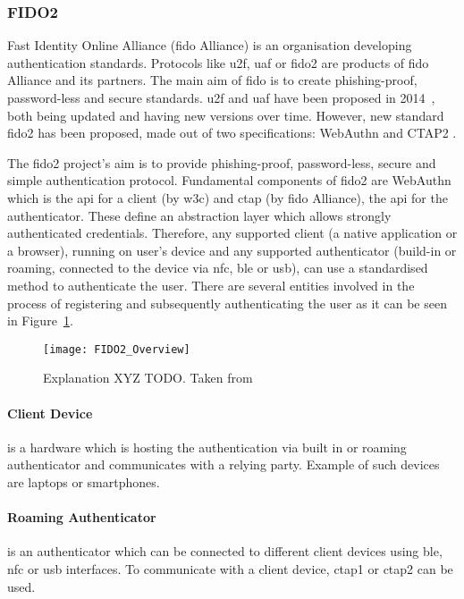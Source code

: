 \subsubsection{FIDO2}

Fast Identity Online Alliance (\acrshort{fido} Alliance) is an organisation developing authentication standards. Protocols like \acrfull{u2f}, \acrfull{uaf} or \acrshort{fido}2 are products of \acrshort{fido} Alliance and its partners.
The main aim of \acrshort{fido} is to create phishing-proof, password-less and secure standards. \acrshort{u2f} and \acrshort{uaf} have been proposed in 2014~\cite{Lindemann2014FIDOV1.0, Srinivas2014UniversalU2F}, both being updated and having new versions over time. However, new standard  \acrshort{fido}2 has been proposed, made out of two specifications: WebAuthn \cite{Balfanz2019Web1} and CTAP2 \cite{Brand2019ClientCTAP}.

The \acrshort{fido}2 project’s aim is to provide phishing-proof, password-less, secure and simple authentication protocol. Fundamental components of \acrshort{fido}2 are WebAuthn which is the \acrshort{api} for a client (by \acrshort{w3c}) and \acrshort{ctap} (by \acrshort{fido} Alliance), the \acrshort{api} for the authenticator. These define an abstraction layer which allows strongly authenticated credentials. Therefore, any supported client (a native application or a browser), running on user’s device and any supported authenticator (build-in or roaming, connected to the device via \acrshort{nfc}, \acrshort{ble} or \acrshort{usb}), can use a standardised method to authenticate the user. There are several entities involved in the process of registering and subsequently authenticating the user as it can be seen in Figure~\ref{fig:fido2_overview}.

\begin{figure}[ht]
    \centering
    \texttt{[image: FIDO2\_Overview]}
    \caption{Explanation XYZ TODO. Taken from~\cite{Dingle2018All288910}}
    \label{fig:fido2_overview}
\end{figure}

\paragraph{Client Device} 
is a hardware which is hosting the authentication via built in or roaming authenticator and communicates with a relying party. Example of such devices are laptops or smartphones. 

\paragraph{Roaming Authenticator} 
is an authenticator which can be connected to different client devices using \acrshort{ble}, \acrshort{nfc} or \acrshort{usb} interfaces. To communicate with a client device, \acrshort{ctap}1 or \acrshort{ctap}2 can be used.

